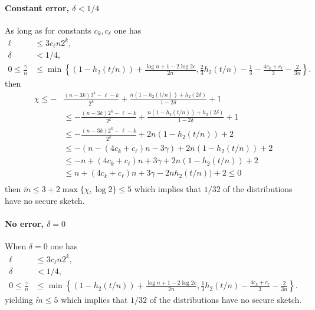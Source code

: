 \paragraph{Constant error, $\delta<1/4$} 
As long as for constants $c_k, c_\ell$ one has
\begin{align*}
\ell&\le 3c_\ell n2^k,\\
\delta &< 1/4,\\
0\le\frac{\gamma}{n} &\le \min\left\{(1-h_2(t/n)) +\frac{\log{n}+1-2\log{2e}}{2n}, \frac{2}{3}h_2(t/n)-\frac{1}{3}-\frac{4c_k+c_\ell}{3}-\frac{2}{3n}\right\}.
\end{align*} then 
\begin{align*}
\chi\le-&\frac{(n-3k)2^k-\ell-k}{2^k} + \frac{n(1-h_2(t/n)) +h_2(2\delta)}{1-2\delta}+1\\
&\le -\frac{(n-3k)2^k-\ell-k}{2^k} + \frac{n(1-h_2(t/n)) +h_2(2\delta)}{1-2\delta}+1 \\
&\le -\frac{(n-3k)2^k-\ell-k}{2^k} + 2n(1-h_2(t/n)) +2\\
 &\le -(n-(4c_k+c_\ell)n - 3\gamma) + 2n(1-h_2(t/n)) +2\\
&\le -n+(4c_k+c_\ell)n+3\gamma + 2n(1-h_2(t/n))+2 \\\
&\le n+(4c_k+c_\ell)n+3\gamma -2nh_2(t/n))+2 \le 0\\
\end{align*}
then $\tilde{m} \le 3+2\max\{\chi, \log{2}\} \le 5$ which implies that $1/32$ of the distributions have no secure sketch.

\paragraph{No error, $\delta=0$}
When $\delta = 0$ one has
\begin{align*}
\ell&\le 3c_\ell n2^k,\\
\delta &< 1/4,\\
0\le\frac{\gamma}{n} &\le \min\left\{(1-h_2(t/n)) +\frac{\log{n}+1-2\log{2e}}{2n}, \frac{1}{3}h_2(t/n)-\frac{4c_k+c_\ell}{3}-\frac{2}{3n}\right\}.
\end{align*} 
yielding $\tilde{m}\le 5$ which implies that $1/32$ of the distributions have no secure sketch.




